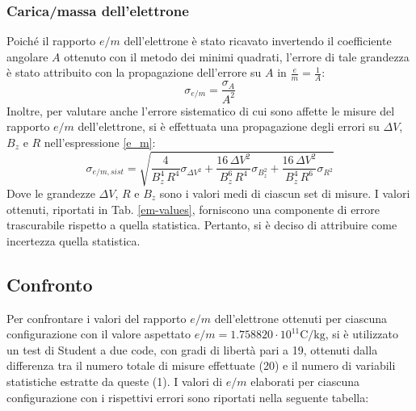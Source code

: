 \documentclass[]{article}
\let\oldsubsection\subsection%
\renewcommand{\subsection}{%
	\renewcommand{\theequation}{\thesubsection.\arabic{equation}}%
	\oldsubsection}%
\begin{document}
    \subsubsection{Carica/massa dell'elettrone}
    Poiché il rapporto $e/m$ dell'elettrone è stato ricavato invertendo il coefficiente angolare $A$ ottenuto con il metodo dei minimi quadrati, l'errore di tale grandezza è stato attribuito con la propagazione dell'errore su $A$ in $\frac{e}{m}=\frac{1}{A}$:
    \begin{equation}
        \label{sigma_e/m}
        \sigma _{e/m} = \frac{\sigma_A}{A^2} 
    \end{equation}
    Inoltre, per valutare anche l'errore sistematico di cui sono affette le misure del rapporto $e/m$ dell'elettrone, si è effettuata una propagazione degli errori su $\Delta V$, $B_z$ e $R$ nell'espressione \ref{e_m}:
    \begin{equation}
        \label{sigma_e/m_sist}
        \sigma _{e/m,sist} = \sqrt{ \frac{4}{B_z^4 \, R^4} \sigma_{\Delta V ^2} + \frac{16 \, \Delta V ^2}{B_z^6 \, R^4} \sigma_{B_z ^2} + \frac{16 \, \Delta V ^2}{B_z^4 \, R^6} \sigma_{R ^2}  }  
    \end{equation}
    Dove le grandezze $\Delta V$, $R$ e $B_z$ sono i valori medi di ciascun set di misure.
    I valori ottenuti, riportati in Tab. \ref{em-values}, forniscono una componente di errore trascurabile rispetto a quella statistica. Pertanto, si è deciso di attribuire come incertezza quella statistica.

    \subsection{Confronto}
    Per confrontare i valori del rapporto $e/m$ dell'elettrone ottenuti per ciascuna configurazione con il valore aspettato
    $e/m = 1.758820 \cdot 10^{11}\text{C/kg}$, si è utilizzato un test di Student a due code, con gradi di libertà pari a 19, ottenuti dalla differenza tra il numero totale di misure effettuate (20) e il numero di variabili statistiche estratte da queste (1).
    I valori di $e/m$ elaborati per ciascuna configurazione con i rispettivi errori sono riportati nella seguente
    tabella:
\end{document}
